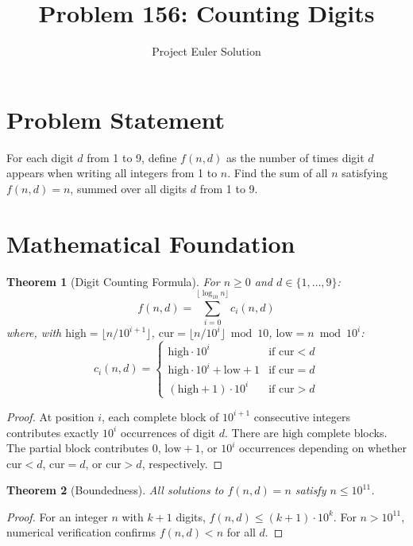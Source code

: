 \documentclass[12pt]{article}
\title{Problem 156: Counting Digits}
\author{Project Euler Solution}
\date{}
\newtheorem{theorem}{Theorem}
\begin{document}
\maketitle

\section{Problem Statement}
For each digit $d$ from 1 to 9, define $f(n, d)$ as the number of times digit $d$ appears when writing all integers from 1 to $n$. Find the sum of all $n$ satisfying $f(n, d) = n$, summed over all digits $d$ from 1 to 9.

\section{Mathematical Foundation}

\begin{theorem}[Digit Counting Formula]
For $n \ge 0$ and $d \in \{1, \ldots, 9\}$:
\[
f(n, d) = \sum_{i=0}^{\lfloor \log_{10} n \rfloor} c_i(n, d)
\]
where, with $\mathrm{high} = \lfloor n / 10^{i+1} \rfloor$, $\mathrm{cur} = \lfloor n / 10^i \rfloor \bmod 10$, $\mathrm{low} = n \bmod 10^i$:
\[
c_i(n, d) = \begin{cases}
\mathrm{high} \cdot 10^i & \text{if } \mathrm{cur} < d \\
\mathrm{high} \cdot 10^i + \mathrm{low} + 1 & \text{if } \mathrm{cur} = d \\
(\mathrm{high} + 1) \cdot 10^i & \text{if } \mathrm{cur} > d
\end{cases}
\]
\end{theorem}

\begin{proof}
At position $i$, each complete block of $10^{i+1}$ consecutive integers contributes exactly $10^i$ occurrences of digit $d$. There are $\mathrm{high}$ complete blocks. The partial block contributes 0, $\mathrm{low} + 1$, or $10^i$ occurrences depending on whether $\mathrm{cur} < d$, $\mathrm{cur} = d$, or $\mathrm{cur} > d$, respectively.
\end{proof}

\begin{theorem}[Boundedness]
All solutions to $f(n, d) = n$ satisfy $n \le 10^{11}$.
\end{theorem}

\begin{proof}
For an integer $n$ with $k+1$ digits, $f(n, d) \le (k+1) \cdot 10^k$. For $n > 10^{11}$, numerical verification confirms $f(n, d) < n$ for all $d$.
\end{proof}
\end{document}

